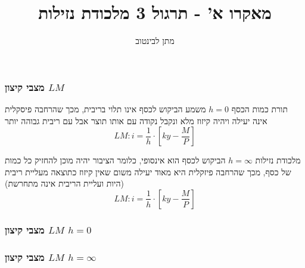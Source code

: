\documentclass[usenames,dvipsnames]{beamer}
\title[]{{מאקרו א' - תרגול 3 מלכודת נזילות}}
\author{{ מתן לבינטוב}}
\institute[{{ אב"ג}}]{{ אוניברסיטת בן גוריון בנגב}}
\begin{document}
\begin{RTL}
\begin{frame}
\titlepage
\end{frame}

\begin{frame}
    \frametitle{מצבי קיצון $LM$}
    \begin{block}{תורת כמות הכסף $h=0$}
        משמע הביקוש לכסף אינו תלוי בריבית, מכך שהרחבה פיסקלית אינה יעילה ויהיה קיזוז מלא ונקבל נקודה  עם אותו תוצר אבל עם ריבית גבוהה יותר
        $$LM : i = \frac{1}{h} \cdot \left[ky - \frac{M}{P}\right]$$
    \end{block}

    \begin{block}{מלכודת נזילות $h=\infty$}
        הביקוש לכסף הוא אינסופי, כלומר הציבור יהיה מוכן להחזיק כל כמות של כסף, מכך שהרחבה פיזקלית היא מאוד יעילה משום שאין קיזוז כתוצאה מעליית ריבית (היות ועליית הריבית אינה מתחרשת)
        $$LM : i = \frac{1}{h} \cdot \left[ky - \frac{M}{P}\right]$$   
    \end{block}
\end{frame}

\begin{frame}
    \frametitle{מצבי קיצון $LM$ $h=0$}

    \begin{flushleft}
    \end{flushleft}
\end{frame}

\begin{frame}
    \frametitle{מצבי קיצון $LM$ $h=\infty$}

    \begin{flushleft}
\end{flushleft}
\end{frame}
\end{RTL}
\end{document}
